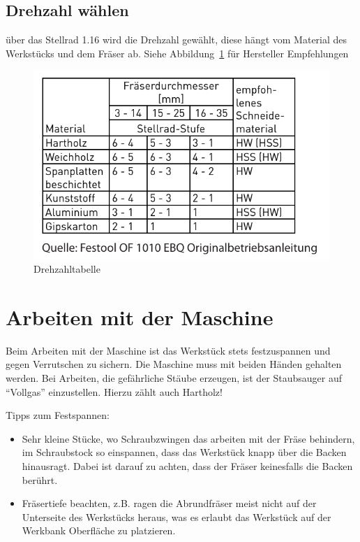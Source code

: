 \documentclass{\basedir/fablab-document}
\begin{document}
\subsection{Drehzahl wählen}
über das Stellrad 1.16 wird die Drehzahl gewählt, diese hängt vom Material des Werkstücks und dem Fräser ab. Siehe Abbildung~\ref{fig:drehzahl} für Hersteller Empfehlungen
\begin{figure}[h!]
    \centering
    \includegraphics{bilder/drehzahltabelle}
    \caption{Drehzahltabelle}
    \label{fig:drehzahl}
\end{figure}

\section{Arbeiten mit der Maschine}
Beim Arbeiten mit der Maschine ist das Werkstück stets festzuspannen und gegen Verrutschen zu sichern. Die Maschine muss mit beiden Händen gehalten werden. Bei Arbeiten, die gefährliche Stäube erzeugen, ist der Staubsauger auf ``Vollgas'' einzustellen. Hierzu zählt auch Hartholz!

Tipps zum Festspannen:
\begin{itemize}
    \item Sehr kleine Stücke, wo Schraubzwingen das arbeiten mit der Fräse behindern, im Schraubstock so einspannen, dass das Werkstück knapp über die Backen hinausragt. Dabei ist darauf zu achten, dass der Fräser keinesfalls die Backen berührt.
    \item Fräsertiefe beachten, z.B. ragen die Abrundfräser meist nicht auf der Unterseite des Werkstücks heraus, was es erlaubt das Werkstück auf der Werkbank Oberfläche zu platzieren.
\end{itemize}
\end{document}
